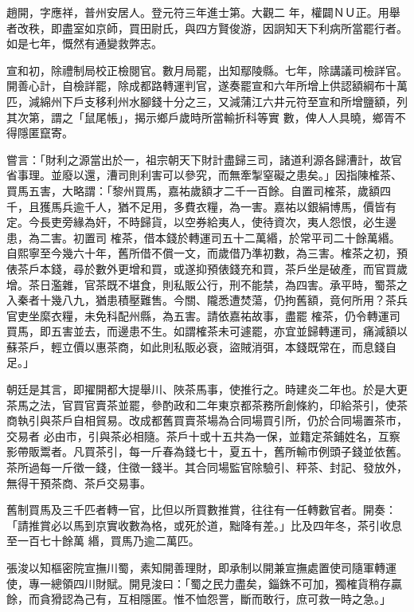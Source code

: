 \begin{pinyinscope}
 趙開，字應祥，普州安居人。登元符三年進士第。大觀二
 年，權闢ＮＵ正。用舉者改秩，即盡室如京師，買田尉氏，與四方賢俊游，因詗知天下利病所當罷行者。如是七年，慨然有通變救弊志。



 宣和初，除禮制局校正檢閱官。數月局罷，出知鄢陵縣。七年，除講議司檢詳官。開善心計，自檢詳罷，除成都路轉運判官，遂奏罷宣和六年所增上供認額綱布十萬匹，減綿州下戶支移利州水腳錢十分之三，又減蒲江六井元符至宣和所增鹽額，列其次第，謂之「鼠尾帳」，揭示鄉戶歲時所當輸折科等實
 數，俾人人具曉，鄉胥不得隱匿竄寄。



 嘗言：「財利之源當出於一，祖宗朝天下財計盡歸三司，諸道利源各歸漕計，故官省事理。並廢以還，漕司則利害可以參究，而無牽掣窒礙之患矣。」因指陳榷茶、買馬五害，大略謂：「黎州買馬，嘉祐歲額才二千一百餘。自置司榷茶，歲額四千，且獲馬兵逾千人，猶不足用，多費衣糧，為一害。嘉祐以銀絹博馬，價皆有定。今長吏旁緣為奸，不時歸貨，以空券給夷人，使待資次，夷人怨恨，必生邊患，為二害。初置司
 榷茶，借本錢於轉運司五十二萬緡，於常平司二十餘萬緡。自熙寧至今幾六十年，舊所借不償一文，而歲借乃準初數，為三害。榷茶之初，預俵茶戶本錢，尋於數外更增和買，或遂抑預俵錢充和買，茶戶坐是破產，而官買歲增。茶日濫雜，官茶既不堪食，則私販公行，刑不能禁，為四害。承平時，蜀茶之入秦者十幾八九，猶患積壓難售。今關、隴悉遭焚蕩，仍拘舊額，竟何所用？茶兵官吏坐縻衣糧，未免科配州縣，為五害。請依嘉祐故事，盡罷
 榷茶，仍令轉運司買馬，即五害並去，而邊患不生。如謂榷茶未可遽罷，亦宜並歸轉運司，痛減額以蘇茶戶，輕立價以惠茶商，如此則私販必衰，盜賊消弭，本錢既常在，而息錢自足。」



 朝廷是其言，即擢開都大提舉川、陜茶馬事，使推行之。時建炎二年也。於是大更茶馬之法，官買官賣茶並罷，參酌政和二年東京都茶務所創條約，印給茶引，使茶商執引與茶戶自相貿易。改成都舊買賣茶場為合同場買引所，仍於合同場置茶市，交易者
 必由市，引與茶必相隨。茶戶十或十五共為一保，並籍定茶鋪姓名，互察影帶販鬻者。凡買茶引，每一斤春為錢七十，夏五十，舊所輸市例頭子錢並依舊。茶所過每一斤徵一錢，住徵一錢半。其合同場監官除驗引、秤茶、封記、發放外，無得干預茶商、茶戶交易事。



 舊制買馬及三千匹者轉一官，比但以所買數推賞，往往有一任轉數官者。開奏：「請推賞必以馬到京實收數為格，或死於道，黜降有差。」比及四年冬，茶引收息至一百七十餘萬
 緡，買馬乃逾二萬匹。



 張浚以知樞密院宣撫川蜀，素知開善理財，即承制以開兼宣撫處置使司隨軍轉運使，專一總領四川財賦。開見浚曰：「蜀之民力盡矣，錙銖不可加，獨榷貨稍存贏餘，而貪猾認為己有，互相隱匿。惟不恤怨詈，斷而敢行，庶可救一時之急。」




\end{pinyinscope}
